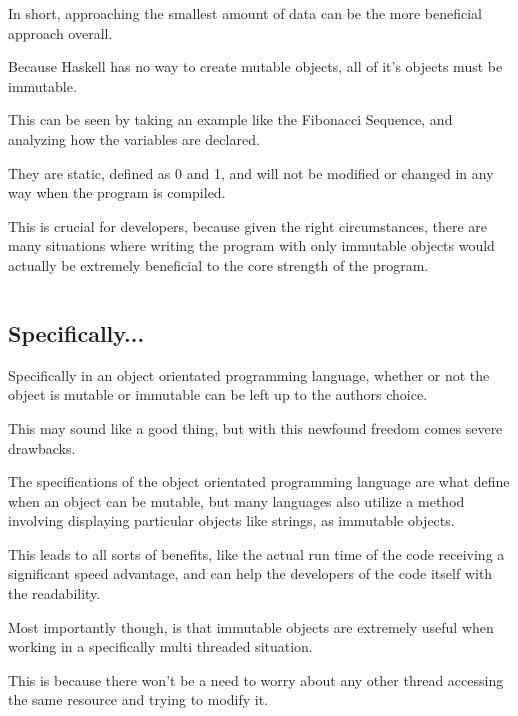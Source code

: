 \documentclass{article}
\begin{document}
\medskip\noindent
In short, approaching the smallest amount of data can be the more beneficial approach overall.

\medskip\noindent
Because Haskell has no way to create mutable objects, all of it's objects must be immutable. 

\medskip\noindent
This can be seen by taking an example like the Fibonacci Sequence, and analyzing how the variables are declared. 

\medskip\noindent
They are static, defined as 0 and 1, and will not be modified or changed in any way when the program is compiled. 

\medskip\noindent
This is crucial for developers, because given the right circumstances, there are many situations where writing the program with only immutable objects would actually be extremely beneficial to the core strength of the program.

\medskip\medskip
\begin{lstlisting}
\end{lstlisting}

\medskip

\subsection{Specifically...}
\medskip\medskip
\hspace{\parindent} 

Specifically in an object orientated programming language, whether or not the object is mutable or immutable can be left up to the authors choice. 

\medskip\noindent
This may sound like a good thing, but with this newfound freedom comes severe drawbacks.

\medskip\noindent
The specifications of the object orientated programming language are what define when an object can be mutable, but many languages also utilize a method involving displaying particular objects like strings, as immutable objects.  

\medskip\noindent
This leads to all sorts of benefits, like the actual run time of the code receiving a significant speed advantage, and can help the developers of the code itself with the readability. 

\medskip\noindent
Most importantly though, is that immutable objects are extremely useful when working in a specifically multi threaded situation.

\medskip\noindent
This is because there won't be a need to worry about any other thread accessing the same resource and trying to modify it.
\end{document}
